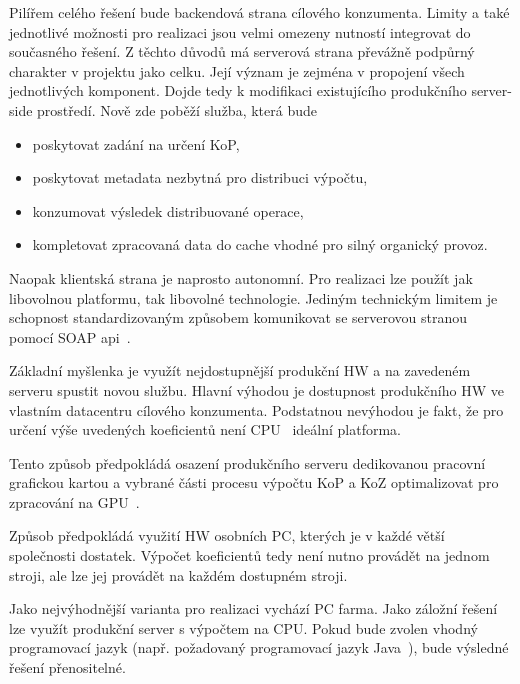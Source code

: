 Pilířem celého řešení bude backendová strana cílového konzumenta. Limity a také jednotlivé možnosti pro realizaci jsou velmi omezeny nutností integrovat do současného řešení. Z těchto důvodů má serverová strana převážně podpůrný charakter v projektu jako celku. Její význam je zejména v propojení všech jednotlivých komponent. Dojde tedy k modifikaci existujícího produkčního server-side prostředí. Nově zde poběží služba, která bude
\begin{itemize}
	\setlength{\parskip}{0pt}
	\setlength{\itemsep}{0pt}
	\item {poskytovat zadání na určení KoP,}
	\item {poskytovat metadata nezbytná pro distribuci výpočtu,}
	\item {konzumovat výsledek distribuované operace,}
	\item {kompletovat zpracovaná data do cache vhodné pro silný organický provoz.}
\end{itemize}
Naopak klientská strana je naprosto autonomní. Pro realizaci lze použít jak libovolnou platformu, tak libovolné technologie. Jediným technickým limitem je schopnost standardizovaným způsobem komunikovat se serverovou stranou pomocí SOAP api~\cite{soap}.

Základní myšlenka je využít nejdostupnější produkční HW a na zavedeném serveru spustit novou službu. Hlavní výhodou je dostupnost produkčního HW ve vlastním datacentru cílového konzumenta. Podstatnou nevýhodou je fakt, že pro určení výše uvedených koeficientů není CPU~\cite{cpu} ideální platforma.

Tento způsob předpokládá osazení produkčního serveru dedikovanou pracovní grafickou kartou a vybrané části procesu výpočtu KoP a KoZ optimalizovat pro zpracování na GPU~\cite{gpu}.

Způsob předpokládá využití HW osobních PC, kterých je v každé větší společnosti dostatek. Výpočet koeficientů tedy není nutno provádět na jednom stroji, ale lze jej provádět na každém dostupném stroji.

Jako nejvýhodnější varianta pro realizaci vychází PC farma. Jako záložní řešení lze využít produkční server s výpočtem na CPU. Pokud bude zvolen vhodný programovací jazyk (např. požadovaný programovací jazyk Java~\cite{java}), bude výsledné řešení přenositelné.

